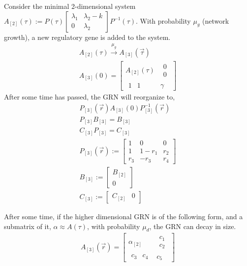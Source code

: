 \documentclass[11 pt]{article}
\newcommand{\1}{\mathbbm{1}}
\begin{document}
      Consider the minimal 2-dimensional system $A_{[2]}(\tau) := P(\tau) \begin{bmatrix} \lambda_{1} & \lambda_{2} - k \\ 0 & \lambda_{2} \end{bmatrix} P^{-1}(\tau)$. With probability $\mu_{g}$ (network growth), a new regulatory gene is added to the system. 
        \begin{align*}
          A_{[2]}(\tau) \xrightarrow{\mu_{g}} A_{[3]}(\vec{\tau}) \\
          A_{[3]}(0) = \begin{bmatrix} A_{[2]}(\tau) & \begin{array}{cc} 0 \\ 0 \end{array} \\ \begin{array}{cc} 1 & 1 \end{array} & \gamma \end{bmatrix}
        \end{align*}
        After some time has passed, the GRN will reorganize to, 
        \begin{align*}
          P_{[3]}(\vec{r})A_{[3]}(0)P_{[3]}^{-1}(\vec{r}) \\
          P_{[3]}B_{[3]} = B_{[3]} \\
          C_{[3]}P_{[3]} = C_{[3]} \\
          P_{[3]}(\vec{r}) := \begin{bmatrix} 1 & 0 & 0 \\ 1 & 1-r_{1} & r_{2} \\ r_{3} & -r_{3} & r_{4} \end{bmatrix} \\ 
        B_{[3]} := \begin{bmatrix} B_{[2]} \\ 0 \end{bmatrix} \\ 
        C_{[3]} := \begin{bmatrix} C_{[2]} & 0 \end{bmatrix}
        \end{align*}

        After some time, if the higher dimensional GRN is of the following form, and a submatrix of it, $\alpha \approx A(\tau)$, with probability $\mu_{d}$, the GRN can decay in size. 
        \begin{align*}
          A_{[3]}(\vec{r}) = \begin{bmatrix} \alpha_{[2]} & \begin{array}{cc} c_{1} \\ c_{2} \end{array} \\ \begin{array}{cc} c_{3} & c_{4} \end{array} & c_{5} \end{bmatrix}
        \end{align*}
\end{document}
